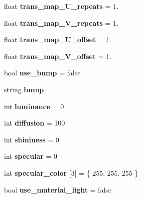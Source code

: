 \begin{DoxyCompactItemize}
float {\bfseries trans\+\_\+map\+\_\+\+U\+\_\+repeats} = 1.
\item 
\mbox{\label{classmaterial_a14a2abe6b059b113689cb75f652222c8}} 
float {\bfseries trans\+\_\+map\+\_\+\+V\+\_\+repeats} = 1.
\item 
\mbox{\label{classmaterial_a72c7e0db201e914d861caec0be4c3e8e}} 
float {\bfseries trans\+\_\+map\+\_\+\+U\+\_\+offset} = 1.
\item 
\mbox{\label{classmaterial_ad6cf1cf5fc8c617e86c4d66ce5995ff8}} 
float {\bfseries trans\+\_\+map\+\_\+\+V\+\_\+offset} = 1.
\item 
\mbox{\label{classmaterial_ac2f9f9bcfe2328041528ef6322b59c71}} 
bool {\bfseries use\+\_\+bump} = false
\item 
\mbox{\label{classmaterial_ae83e4a5d834b78b59a38db6d96fba982}} 
string {\bfseries bump}
\item 
\mbox{\label{classmaterial_a8bccc78ba19a32957f91f28322e10496}} 
int {\bfseries luminance} = 0
\item 
\mbox{\label{classmaterial_adaa4ae42328332fd6bb34fe468416496}} 
int {\bfseries diffusion} = 100
\item 
\mbox{\label{classmaterial_a08f6c477c078af3687d24fc446de6f24}} 
int {\bfseries shininess} = 0
\item 
\mbox{\label{classmaterial_a7e30e943dc2ee28c8652dfb892144631}} 
int {\bfseries specular} = 0
\item 
\mbox{\label{classmaterial_a0e0e985fe11f12467dc84eb7e774e1ae}} 
int {\bfseries specular\+\_\+color} \mbox{[}3\mbox{]} = \{ 255, 255, 255 \}
\item 
\mbox{\label{classmaterial_a0fee3e4a752a99f5205348c3c5ed9e34}} 
bool {\bfseries use\+\_\+material\+\_\+light} = false
\item 
\mbox{\label{classmaterial_aa1f2a51ab9d0850560850748a261e812}} 

\end{DoxyCompactItemize}
